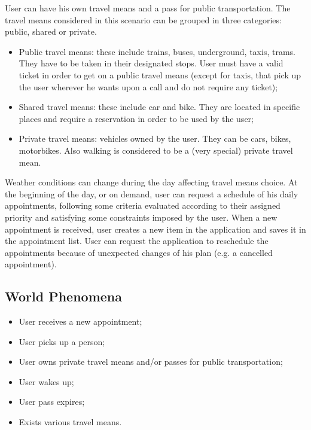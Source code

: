 User can have his own travel means and a pass for public transportation. 
The travel means considered in this scenario can be grouped in three categories: public, shared or private.
\begin{itemize}
\item Public travel means: these include trains, buses, underground, taxis, trams. They have to be taken in their designated stops. User must have a valid ticket in order to get on a public travel means (except for taxis, that pick up the user wherever he wants upon a call and do not require any ticket); 
\item Shared travel means: these include car and bike. They are located in specific places and require a reservation in order to be used by the user;
\item Private travel means: vehicles owned by the user. They can be cars, bikes, motorbikes. Also walking is considered to be a (very special) private travel mean.
\end{itemize}

Weather conditions can change during the day affecting travel means choice.
At the beginning of the day, or on demand, user can request a schedule of his daily appointments, following some criteria evaluated according to their assigned priority and satisfying some constraints imposed by the user.
When a new appointment is received, user creates a new item in the application and saves it in the appointment list. User can request the application to reschedule the appointments because of unexpected changes of his plan (e.g. a cancelled appointment).

\subsection{World Phenomena}
\begin{itemize}
\item User receives a new appointment;
\item User picks up a person;
\item User owns private travel means and/or passes for public transportation;
\item User wakes up;
\item User pass expires;
\item Exists various travel means.
\end{itemize}


